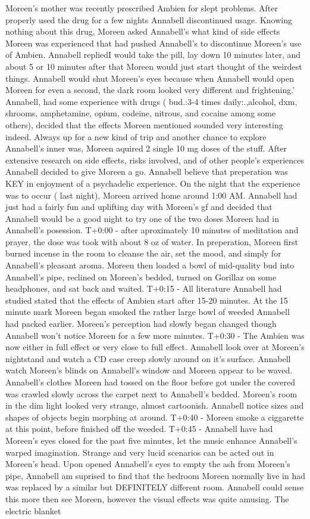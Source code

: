 \documentclass[12pt]{book}
\begin{document}
Moreen's mother was recently prescribed Ambien for slept problems. After properly used the drug for a few nights Annabell discontinued usage. Knowing nothing about this drug, Moreen asked Annabell's what kind of side effects Moreen was experienced that had pushed Annabell's to discontinue Moreen's use of Ambien. Annabell repliedI would take the pill, lay down 10 minutes later, and about 5 or 10 minutes after that Moreen would just start thought of the weirdest things. Annabell would shut Moreen's eyes because when Annabell would open Moreen for even a second, the dark room looked very different and frightening.' Annabell, had some experience with drugs ( bud.:3-4 times daily:.,alcohol, dxm, shrooms, amphetamine, opium, codeine, nitrous, and cocaine among some others), decided that the effects Moreen mentioned sounded very interesting indeed. Always up for a new kind of trip and another chance to explore Annabell's inner was, Moreen aquired 2 single 10 mg doses of the stuff. After extensive research on side effects, risks involved, and of other people's experiences Annabell decided to give Moreen a go. Annabell believe that preperation was KEY in enjoyment of a psychadelic experience. On the night that the experience was to occur ( last night), Moreen arrived home around 1:00 AM. Annabell had just had a fairly fun and uplifting day with Moreen's gf and decided that Annabell would be a good night to try one of the two doses Moreen had in Annabell's posession. T+0:00 - after aproximately 10 minutes of meditation and prayer, the dose was took with about 8 oz of water. In preperation, Moreen first burned incense in the room to cleanse the air, set the mood, and simply for Annabell's pleasant aroma. Moreen then loaded a bowl of mid-quality bud into Annabell's pipe, reclined on Moreen's bedded, turned on Gorillaz on some headphones, and sat back and waited. T+0:15 - All literature Annabell had studied stated that the effects of Ambien start after 15-20 minutes. At the 15 minute mark Moreen began smoked the rather large bowl of weeded Annabell had packed earlier. Moreen's perception had slowly began changed though Annabell won't notice Moreen for a few more minutes. T+0:30 - The Ambien was now either in full effect or very close to full effect. Annabell look over at Moreen's nightstand and watch a CD case creep slowly around on it's surface. Annabell watch Moreen's blinds on Annabell's window and Moreen appear to be waved. Annabell's clothes Moreen had tossed on the floor before got under the covered was crawled slowly across the carpet next to Annabell's bedded. Moreen's room in the dim light looked very strange, almost cartoonish. Annabell notice sizes and shapes of objects begin morphing at around. T+0:40 - Moreen smoke a ciggarette at this point, before finished off the weeded. T+0:45 - Annabell have had Moreen's eyes closed for the past five minutes, let the music enhance Annabell's warped imagination. Strange and very lucid scenarios can be acted out in Moreen's head. Upon opened Annabell's eyes to empty the ash from Moreen's pipe, Annabell am suprised to find that the bedroom Moreen normally live in had was replaced by a similar but DEFINITELY different room. Annabell could sense this more then see Moreen, however the visual effects was quite amusing. The electric blanket 
\end{document}

